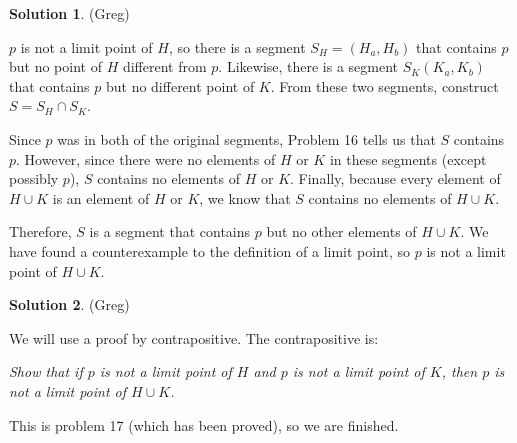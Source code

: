 \documentclass{article}
\theoremstyle{definition}
\newtheorem{solution}{Solution}
\begin{document}
\begin{solution} %
(Greg)

$p$ is not a limit point of $H$, so there is a segment $S_H = (H_a, H_b)$ that contains $p$ but no point of $H$ different from $p$.
Likewise, there is a segment $S_K (K_a, K_b)$ that contains $p$ but no different point of $K$.
From these two segments, construct $S = S_H \cap S_K$. 

Since $p$ was in both of the original segments, Problem 16 tells us that $S$ contains $p$.
However, since there were no elements of $H$ or $K$ in these segments (except possibly $p$), $S$ contains no elements of $H$ or $K$.
Finally, because every element of $H \cup K$ is an element of $H$ or $K$, we know that $S$ contains no elements of $H \cup K$.

Therefore, $S$ is a segment that contains $p$ but no other elements of $H \cup K$.
We have found a counterexample to the definition of a limit point, so $p$ is not a limit point of $H \cup K$.
\end{solution}

\begin{solution} %
(Greg)

We will use a proof by contrapositive. The contrapositive is:

\textit{Show that if $p$ is not a limit point of $H$ and $p$ is not a limit point of $K$, then $p$ is not a limit point of $H \cup K$.}

This is problem 17 (which has been proved), so we are finished.
\end{solution}
\end{document}

